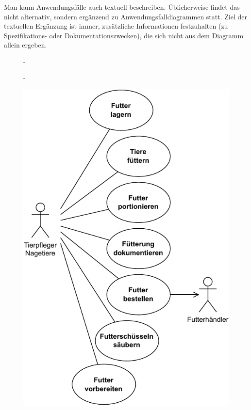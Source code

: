 \vspace{1mm} %


Man kann Anwendungsfälle auch textuell beschreiben. Üblicherweise findet das nicht alternativ, sondern ergänzend zu Anwendungsfalldiagrammen statt. Ziel der textuellen Ergänzung ist immer, zusätzliche Informationen festzuhalten (zu Spezifikations- oder Dokumentationszwecken), die sich nicht aus dem Diagramm allein ergeben. 

\begin{figure}[h!]
	\begin{addmargin*}[0cm]{-\marginparwidth}
		\begin{addmargin*}[0cm]{-\marginparsep}
			\vspace{5mm} %
			\centering
			\begin{minipage}[c]{7.5cm} 
				\centering
				\includegraphics[scale=0.8]{Bilder/Kapitel-6/anwendungsfall_tiere_fuettern_nagetiere.pdf}

\end{minipage}
\end{addmargin*}
\end{addmargin*}
\end{figure}
